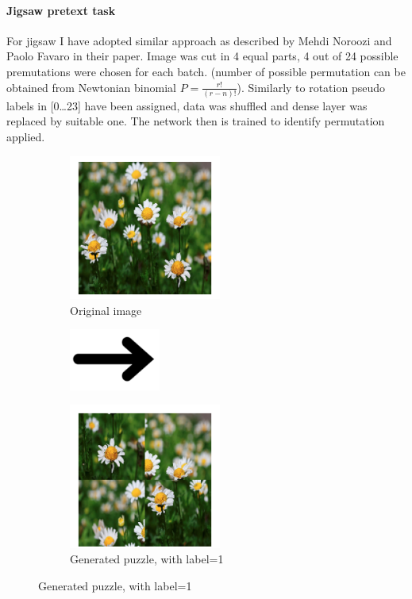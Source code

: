\paragraph{Jigsaw pretext task}
For jigsaw I have adopted similar approach as described by Mehdi Noroozi and Paolo Favaro in their paper\cite{DBLP:journals/corr/NorooziF16}.
Image was cut in 4 equal parts, 4 out of 24 possible premutations were chosen for each batch.
(number of possible permutation can be obtained from Newtonian binomial $P=\frac{r!}{(r-n)!}$).
Similarly to rotation pseudo labels in [0\ldots23] have been assigned, data was shuffled and dense layer was replaced by suitable one.
The network then is trained to identify permutation applied.
\\
\begin{figure}
    \begin{subfigure}{0.33\textwidth}
        \caption{Original image}
        \includegraphics[width=5cm]{images/dandelion}
    \end{subfigure}
    \begin{subfigure}{0.2\textwidth}
        \includegraphics[width=3cm]{images/arrow}
    \end{subfigure}
    \begin{subfigure}{0.33\textwidth}
        \caption{Generated puzzle, with label=1}
        \includegraphics[width=5cm]{images/puzzle}
    \end{subfigure}
\end{figure}


